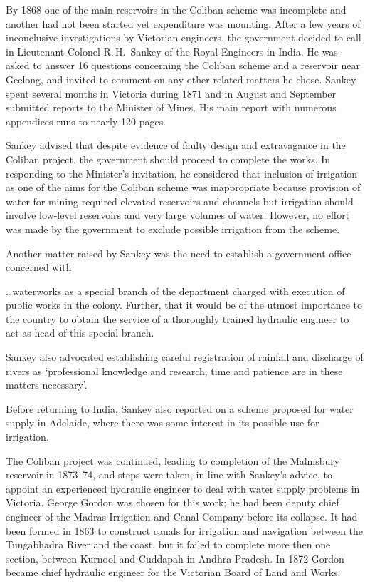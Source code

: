 By 1868 one of the main reservoirs in the Coliban scheme was
incomplete and another had not been started yet expenditure was
mounting.  After a few years of inconclusive investigations by
Victorian engineers, the government decided to call in
Lieutenant-Colonel R.\,H.~Sankey  of the Royal
Engineers in India.  He was asked to answer 16 questions concerning
the Coliban scheme and a reservoir near Geelong, 
and invited to comment on any other related matters he chose. Sankey
spent several months in Victoria during 1871 and in August and
September submitted reports to the Minister of Mines. His main report
with numerous appendices runs to nearly 120 pages.

Sankey advised that despite evidence of faulty design and extravagance
in the Coliban project,  the
government should proceed to complete the works.  In responding to the
Minister's invitation, he considered that inclusion of irrigation as
one of the aims for the Coliban scheme was inappropriate because
provision of water for mining required elevated reservoirs and
channels but irrigation should
involve low-level reservoirs and very large volumes of water.
However, no effort was made by the government to exclude possible
irrigation from the scheme.

Another matter raised by Sankey was the need to establish a government
office concerned with 
\begin{Quote}
\ldots waterworks as a special branch of the department charged with
execution of public works in the colony.  Further, that it would be of
the utmost importance to the country to obtain the service of a
thoroughly trained hydraulic engineer to act as head of this special
branch.
\end{Quote}
Sankey also advocated establishing careful registration of rainfall
and discharge of rivers as `professional knowledge and research, time
and patience are in these matters necessary'.

Before returning to India, Sankey also reported on a scheme proposed
for water supply in Adelaide, where there was some interest in its
possible use for irrigation.

The Coliban project was continued, leading to completion of the
Mal\-msbury reservoir in 1873--74, and steps were taken, in line with
San\-key's advice, to appoint an experienced hydraulic engineer to
deal with water supply problems in Victoria.  George Gordon
 was chosen for this work; he had been deputy chief
engineer of the Madras Irrigation and Canal Company before its
collapse.  It had been formed in 1863 to construct
canals for irrigation and
navigation between the Tungabhadra River  and the coast,
but it failed to complete more then one section, between Kurnool and
Cuddapah in Andhra Pradesh.  In 1872 Gordon became chief hydraulic
engineer for the Victorian Board of Land and Works.

